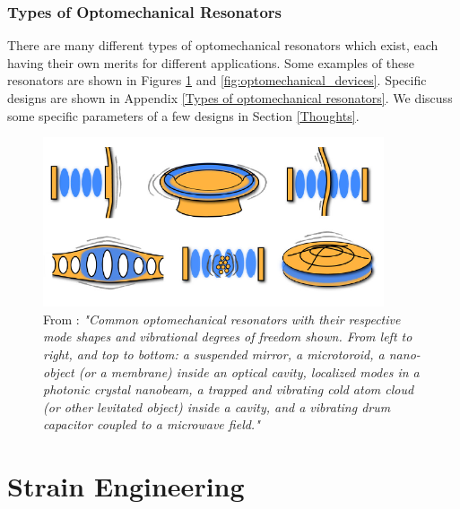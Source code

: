 \documentclass[%
 reprint,
nofootinbib,
 amsmath,amssymb,
 aps,
]{revtex4-2}
\begin{document}
\subsubsection{Types of Optomechanical Resonators}

There are many different types of optomechanical resonators which exist, each having their own merits for different applications. Some examples of these resonators are shown in Figures \ref{fig:optomechanical_resonators} and \ref{fig:optomechanical_devices}. Specific designs are shown in Appendix \ref{Types of optomechanical resonators}. We discuss some specific parameters of a few designs in Section \ref{Thoughts}.

\begin{figure}[htb]
    \centering
    \includegraphics[width=\columnwidth, height=5cm]{optomechanical_resonators.PNG}
    \caption{From \cite{cavity_optomechanics_2014}: \textit{"Common optomechanical resonators with their respective mode shapes and vibrational degrees of freedom shown. From left to right, and top to bottom: a suspended mirror, a microtoroid, a nano-object (or a membrane) inside an optical cavity, localized modes in a photonic crystal nanobeam, a trapped and vibrating cold atom cloud (or other levitated object) inside a cavity, and a vibrating drum
    capacitor coupled to a microwave field."}}
    \label{fig:optomechanical_resonators}
\end{figure}


\section{Strain Engineering}\label{Strain Engineering}
\end{document}
